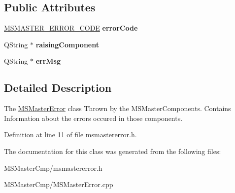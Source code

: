 \subsection*{Public Attributes}
\begin{DoxyCompactItemize}
\item 
\hypertarget{class_m_s_master_error_ad600de0b538d634c7ce5ea94eb2ce49a_ad600de0b538d634c7ce5ea94eb2ce49a}{\hyperlink{class_m_s_master_error_aa1deb878016117b72d744363b49a16e4_aa1deb878016117b72d744363b49a16e4}{M\-S\-M\-A\-S\-T\-E\-R\-\_\-\-E\-R\-R\-O\-R\-\_\-\-C\-O\-D\-E} {\bfseries error\-Code}}\label{class_m_s_master_error_ad600de0b538d634c7ce5ea94eb2ce49a_ad600de0b538d634c7ce5ea94eb2ce49a}

\item 
\hypertarget{class_m_s_master_error_a14899875fb763876453cfc8f781c1a03_a14899875fb763876453cfc8f781c1a03}{Q\-String $\ast$ {\bfseries raising\-Component}}\label{class_m_s_master_error_a14899875fb763876453cfc8f781c1a03_a14899875fb763876453cfc8f781c1a03}

\item 
\hypertarget{class_m_s_master_error_a05456d32a4ac9b5d5eddf1b90f1a67bd_a05456d32a4ac9b5d5eddf1b90f1a67bd}{Q\-String $\ast$ {\bfseries err\-Msg}}\label{class_m_s_master_error_a05456d32a4ac9b5d5eddf1b90f1a67bd_a05456d32a4ac9b5d5eddf1b90f1a67bd}

\end{DoxyCompactItemize}


\subsection{Detailed Description}
The \hyperlink{class_m_s_master_error}{M\-S\-Master\-Error} class Thrown by the M\-S\-Master\-Components. Contains Information about the errors occured in those components. 

Definition at line 11 of file msmastererror.\-h.



The documentation for this class was generated from the following files\-:\begin{DoxyCompactItemize}
\item 
M\-S\-Master\-Cmp/msmastererror.\-h\item 
M\-S\-Master\-Cmp/M\-S\-Master\-Error.\-cpp\end{DoxyCompactItemize}
